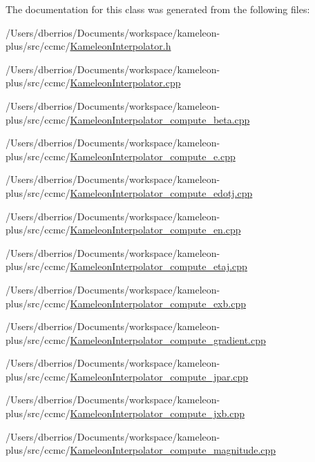 The documentation for this class was generated from the following files\-:\begin{DoxyCompactItemize}
\item 
/\-Users/dberrios/\-Documents/workspace/kameleon-\/plus/src/ccmc/\hyperlink{_kameleon_interpolator_8h}{Kameleon\-Interpolator.\-h}\item 
/\-Users/dberrios/\-Documents/workspace/kameleon-\/plus/src/ccmc/\hyperlink{_kameleon_interpolator_8cpp}{Kameleon\-Interpolator.\-cpp}\item 
/\-Users/dberrios/\-Documents/workspace/kameleon-\/plus/src/ccmc/\hyperlink{_kameleon_interpolator__compute__beta_8cpp}{Kameleon\-Interpolator\-\_\-compute\-\_\-beta.\-cpp}\item 
/\-Users/dberrios/\-Documents/workspace/kameleon-\/plus/src/ccmc/\hyperlink{_kameleon_interpolator__compute__e_8cpp}{Kameleon\-Interpolator\-\_\-compute\-\_\-e.\-cpp}\item 
/\-Users/dberrios/\-Documents/workspace/kameleon-\/plus/src/ccmc/\hyperlink{_kameleon_interpolator__compute__edotj_8cpp}{Kameleon\-Interpolator\-\_\-compute\-\_\-edotj.\-cpp}\item 
/\-Users/dberrios/\-Documents/workspace/kameleon-\/plus/src/ccmc/\hyperlink{_kameleon_interpolator__compute__en_8cpp}{Kameleon\-Interpolator\-\_\-compute\-\_\-en.\-cpp}\item 
/\-Users/dberrios/\-Documents/workspace/kameleon-\/plus/src/ccmc/\hyperlink{_kameleon_interpolator__compute__etaj_8cpp}{Kameleon\-Interpolator\-\_\-compute\-\_\-etaj.\-cpp}\item 
/\-Users/dberrios/\-Documents/workspace/kameleon-\/plus/src/ccmc/\hyperlink{_kameleon_interpolator__compute__exb_8cpp}{Kameleon\-Interpolator\-\_\-compute\-\_\-exb.\-cpp}\item 
/\-Users/dberrios/\-Documents/workspace/kameleon-\/plus/src/ccmc/\hyperlink{_kameleon_interpolator__compute__gradient_8cpp}{Kameleon\-Interpolator\-\_\-compute\-\_\-gradient.\-cpp}\item 
/\-Users/dberrios/\-Documents/workspace/kameleon-\/plus/src/ccmc/\hyperlink{_kameleon_interpolator__compute__jpar_8cpp}{Kameleon\-Interpolator\-\_\-compute\-\_\-jpar.\-cpp}\item 
/\-Users/dberrios/\-Documents/workspace/kameleon-\/plus/src/ccmc/\hyperlink{_kameleon_interpolator__compute__jxb_8cpp}{Kameleon\-Interpolator\-\_\-compute\-\_\-jxb.\-cpp}\item 
/\-Users/dberrios/\-Documents/workspace/kameleon-\/plus/src/ccmc/\hyperlink{_kameleon_interpolator__compute__magnitude_8cpp}{Kameleon\-Interpolator\-\_\-compute\-\_\-magnitude.\-cpp}\item 

\end{DoxyCompactItemize}
